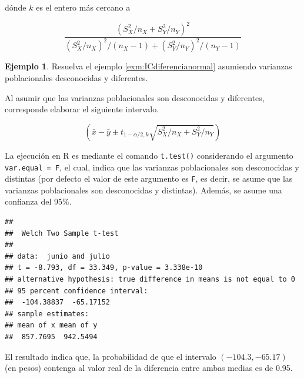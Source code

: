\documentclass[
  11pt,
]{book}
\newenvironment{Shaded}{\begin{snugshade}}{\end{snugshade}}
\newcommand{\AttributeTok}[1]{\textcolor[rgb]{0.13,0.29,0.53}{#1}}
\newcommand{\FloatTok}[1]{\textcolor[rgb]{0.00,0.00,0.81}{#1}}
\newcommand{\FunctionTok}[1]{\textcolor[rgb]{0.13,0.29,0.53}{\textbf{#1}}}
\newcommand{\NormalTok}[1]{#1}
\newcommand{\OtherTok}[1]{\textcolor[rgb]{0.56,0.35,0.01}{#1}}
\newcommand{\SpecialCharTok}[1]{\textcolor[rgb]{0.81,0.36,0.00}{\textbf{#1}}}
\newcommand{\StringTok}[1]{\textcolor[rgb]{0.31,0.60,0.02}{#1}}
\theoremstyle{definition}
\theoremstyle{definition}
\newtheorem{example}{Ejemplo}[chapter]
\theoremstyle{definition}
\theoremstyle{definition}
\theoremstyle{remark}
\begin{document}
dónde \(k\) es el entero más cercano a

\[\frac{(S_X^2/n_X + S_Y^2/n_Y)^2}{(S_X^2/n_X)^2/(n_X-1) + (S_Y^2/n_Y)^2/(n_Y-1)}\]

\begin{example}
Resuelva el ejemplo \ref{exm:ICdiferencianormal} asumiendo varianzas poblacionales desconocidas y diferentes.

Al asumir que las varianzas poblacionales son desconocidas y diferentes, corresponde elaborar el siguiente intervalo.

\[\left(\bar{x} - \bar{y} \pm t_{1-\alpha/2,k}\sqrt{S^2_X/n_X + S^2_Y/n_Y}\right)\]

La ejecución en R es mediante el comando \texttt{t.test()} considerando el argumento \texttt{var.equal\ =\ F}, el cual, indica que las varianzas poblacionales son desconocidas y distintas (por defecto el valor de este argumento es \texttt{F}, es decir, se asume que las varianzas poblacionales son desconocidas y distintas). Además, se asume una confianza del 95\%.

\begin{Shaded}
\end{Shaded}

\begin{verbatim}
## 
##  Welch Two Sample t-test
## 
## data:  junio and julio
## t = -8.793, df = 33.349, p-value = 3.338e-10
## alternative hypothesis: true difference in means is not equal to 0
## 95 percent confidence interval:
##  -104.38837  -65.17152
## sample estimates:
## mean of x mean of y 
##  857.7695  942.5494
\end{verbatim}

El resultado indica que, la probabilidad de que el intervalo \((-104.3,  -65.17)\) (en pesos) contenga al valor real de la diferencia entre ambas medias es de 0.95.
\end{example}
\end{document}
